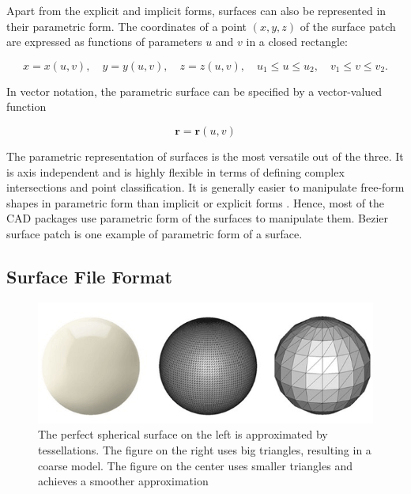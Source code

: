 Apart from the explicit and implicit forms, surfaces can also be represented in their parametric form. The coordinates of a point $(x,y,z)$ of the surface patch are expressed as functions of parameters $u$ and $v$ in a closed rectangle:

\begin{equation}
x=x(u, v), \quad y=y(u, v), \quad z=z(u, v), \quad u_{1} \leq u \leq u_{2}, \quad v_{1} \leq v \leq v_{2}.
\end{equation}

In vector notation, the parametric surface can be specified by a vector-valued function

\begin{equation}
\mathbf{r}=\mathbf{r}(u, v)
\end{equation}

The parametric representation of surfaces is the most versatile out of the three. It is axis independent and is highly flexible in terms of defining complex intersections and point classification. It is generally easier to manipulate free-form shapes in parametric form than implicit or explicit forms  \cite{patrikalakis2009shape}. Hence, most of the CAD packages use parametric form of the surfaces to manipulate them. Bezier surface patch is one example of parametric form of a surface. 

\subsection{Surface File Format}


\begin{figure}
  \centering
  \includegraphics[width=\linewidth]{img/m1/tessellation.png}
  \caption{The perfect spherical surface on the left is approximated by tessellations. The figure on the right uses big triangles, resulting in a coarse model. The figure on the center uses smaller triangles and achieves a smoother approximation \cite{fileFormat}}
  \label{fig-tesellation}
\end{figure}

